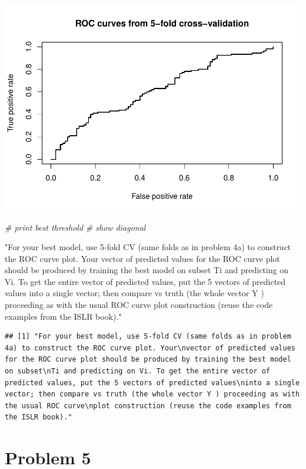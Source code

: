 \documentclass[
  11pt,
]{article}
\newenvironment{Shaded}{\begin{snugshade}}{\end{snugshade}}
\newcommand{\CommentTok}[1]{\textcolor[rgb]{0.56,0.35,0.01}{\textit{#1}}}
\newcommand{\StringTok}[1]{\textcolor[rgb]{0.31,0.60,0.02}{#1}}
\begin{document}
\includegraphics{final_GCM_files/figure-latex/unnamed-chunk-10-6.pdf}

\begin{Shaded}
\begin{Highlighting}[]
\CommentTok{\# print best threshold}
\CommentTok{\# show diagonal}

\StringTok{"For your best model, use 5{-}fold CV (same folds as in problem 4a) to construct the ROC curve plot. Your}
\StringTok{vector of predicted values for the ROC curve plot should be produced by training the best model on subset}
\StringTok{Ti and predicting on Vi. To get the entire vector of predicted values, put the 5 vectors of predicted values}
\StringTok{into a single vector; then compare vs truth (the whole vector Y ) proceeding as with the usual ROC curve}
\StringTok{plot construction (reuse the code examples from the ISLR book)."}
\end{Highlighting}
\end{Shaded}

\begin{verbatim}
## [1] "For your best model, use 5-fold CV (same folds as in problem 4a) to construct the ROC curve plot. Your\nvector of predicted values for the ROC curve plot should be produced by training the best model on subset\nTi and predicting on Vi. To get the entire vector of predicted values, put the 5 vectors of predicted values\ninto a single vector; then compare vs truth (the whole vector Y ) proceeding as with the usual ROC curve\nplot construction (reuse the code examples from the ISLR book)."
\end{verbatim}

\hypertarget{problem-5}{%
\section{Problem 5}\label{problem-5}}
\end{document}
